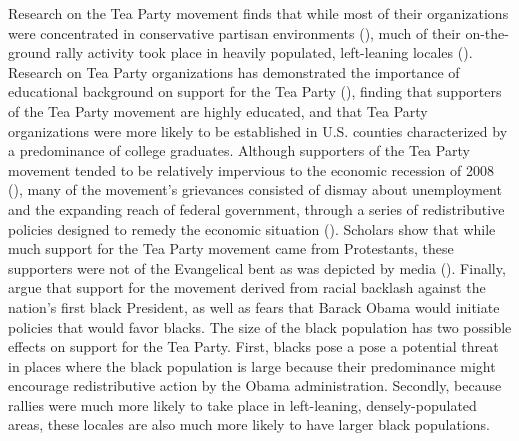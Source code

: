 \documentclass[]{article}
\begin{document}
{Research on the Tea Party movement finds that while most of their organizations were concentrated in conservative partisan environments (\citealt{mcveigh_et_al_2014a,skocpol_and_williamson_2012}), much of their on-the-ground rally activity took place in heavily populated, left-leaning locales (\citealt{skocpol_and_williamson_2012,zernike_2010}). Research on Tea Party organizations has demonstrated the importance of educational background on support for the Tea Party (\citealt{mcveigh_et_al_2014a,skocpol_and_williamson_2012}), finding that supporters of the Tea Party movement are highly educated, and that Tea Party organizations were more likely to be established in U.S. counties characterized by a predominance of college graduates. Although supporters of the Tea Party movement tended to be relatively impervious to the economic recession of 2008 (\citealt{skocpol_and_williamson_2012,parker_and_barreto_2013}), many of the movement's grievances consisted of dismay about unemployment and the expanding reach of federal government, through a series of redistributive policies designed to remedy the economic situation (\citealt{skocpol_and_williamson_2012,mcveigh_et_al_2014a,parker_and_barreto_2013}). Scholars show that while much support for the Tea Party movement came from Protestants, these supporters were not of the Evangelical bent as was depicted by media (\citealt{zernike_2010,skocpol_and_williamson_2012,mcveigh_et_al_2014a}). Finally, \citet{parker_and_barreto_2013} argue that support for the movement derived from racial backlash against the nation's first black President, as well as fears that Barack Obama would initiate policies that would favor blacks. The size of the black population has two possible effects on support for the Tea Party. First, blacks pose a pose a potential threat in places where the black population is large because their predominance might encourage redistributive action by the Obama administration. Secondly, because rallies were much more likely to take place in left-leaning, densely-populated areas, these locales are also much more likely to have larger black populations.  

}
\end{document}
